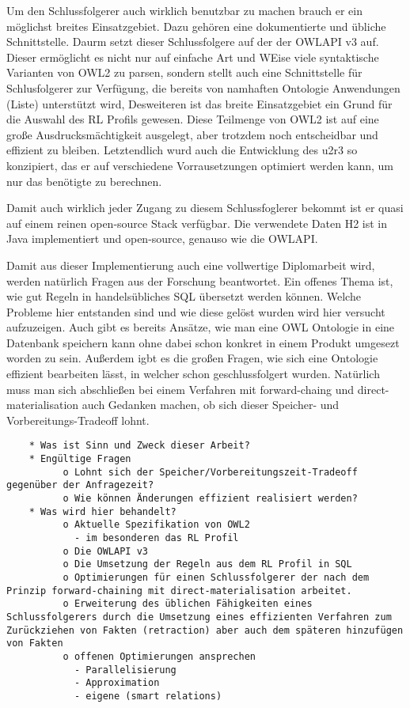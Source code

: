 Um den Schlussfolgerer auch wirklich benutzbar zu machen brauch er ein möglichst breites Einsatzgebiet. Dazu gehören eine dokumentierte und übliche Schnittstelle. Daurm setzt dieser Schlussfolgere auf der der OWLAPI v3 \cite{OWLAPI} auf. Dieser ermöglicht es nicht nur auf einfache Art und WEise viele syntaktische Varianten von OWL2 zu parsen, sondern stellt auch eine Schnittstelle für Schlusfolgerer zur Verfügung, die bereits von namhaften Ontologie Anwendungen (Liste) unterstützt wird, Desweiteren ist das breite Einsatzgebiet ein Grund für die Auswahl des RL Profils gewesen. Diese Teilmenge von OWL2 ist auf eine große Ausdrucksmächtigkeit ausgelegt, aber trotzdem noch entscheidbar und effizient zu bleiben. Letztendlich wurd auch die Entwicklung des u2r3 so konzipiert, das er auf verschiedene Vorrausetzungen optimiert werden kann, um nur das benötigte zu berechnen.

Damit auch wirklich jeder Zugang zu diesem Schlussfoglerer bekommt ist er quasi auf einem reinen open-source Stack verfügbar. Die verwendete Daten H2 ist in Java implementiert und open-source, genauso wie die OWLAPI.

Damit aus dieser Implementierung auch eine vollwertige Diplomarbeit wird, werden natürlich Fragen aus der Forschung beantwortet. Ein offenes Thema ist, wie gut Regeln in handelsübliches SQL übersetzt werden können. Welche Probleme hier entstanden sind und wie diese gelöst wurden wird hier versucht aufzuzeigen. Auch gibt es bereits Ansätze, wie man eine OWL Ontologie in eine Datenbank speichern kann \cite{Kleb2009OWLDB} ohne dabei schon konkret in einem Produkt umgesezt worden zu sein. Außerdem igbt es die großen Fragen, wie sich eine Ontologie effizient bearbeiten lässt, in welcher schon geschlussfolgert wurden. Natürlich muss man sich abschließen bei einem Verfahren mit forward-chaing und direct-materialisation auch Gedanken machen, ob sich dieser Speicher- und Vorbereitungs-Tradeoff lohnt.

\begin{verbatim}
    * Was ist Sinn und Zweck dieser Arbeit?
    * Engültige Fragen
          o Lohnt sich der Speicher/Vorbereitungszeit-Tradeoff gegenüber der Anfragezeit?
          o Wie können Änderungen effizient realisiert werden? 
    * Was wird hier behandelt?
          o Aktuelle Spezifikation von OWL2
            - im besonderen das RL Profil
          o Die OWLAPI v3
          o Die Umsetzung der Regeln aus dem RL Profil in SQL
          o Optimierungen für einen Schlussfolgerer der nach dem Prinzip forward-chaining mit direct-materialisation arbeitet.
          o Erweiterung des üblichen Fähigkeiten eines Schlussfolgerers durch die Umsetzung eines effizienten Verfahren zum Zurückziehen von Fakten (retraction) aber auch dem späteren hinzufügen von Fakten
          o offenen Optimierungen ansprechen
            - Parallelisierung
            - Approximation
            - eigene (smart relations)
\end{verbatim}


